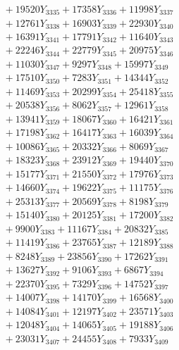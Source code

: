 \documentclass[a4paper,10pt]{article}
\begin{document}
{\begin{align}
&\;  + 19520 Y_{3335} + 17358 Y_{3336} + 11998 Y_{3337} \\[0.3ex]
&\;  + 12761 Y_{3338} + 16903 Y_{3339} + 22930 Y_{3340} \\[0.3ex]
&\;  + 16391 Y_{3341} + 17791 Y_{3342} + 11640 Y_{3343} \\[0.3ex]
&\;  + 22246 Y_{3344} + 22779 Y_{3345} + 20975 Y_{3346} \\[0.3ex]
&\;  + 11030 Y_{3347} + 9297 Y_{3348} + 15997 Y_{3349} \\[0.3ex]
&\;  + 17510 Y_{3350} + 7283 Y_{3351} + 14344 Y_{3352} \\[0.3ex]
&\;  + 11469 Y_{3353} + 20299 Y_{3354} + 25418 Y_{3355} \\[0.3ex]
&\;  + 20538 Y_{3356} + 8062 Y_{3357} + 12961 Y_{3358} \\[0.5ex]\allowbreak
&\;  + 13941 Y_{3359} + 18067 Y_{3360} + 16421 Y_{3361} \\[0.3ex]
&\;  + 17198 Y_{3362} + 16417 Y_{3363} + 16039 Y_{3364} \\[0.3ex]
&\;  + 10086 Y_{3365} + 20332 Y_{3366} + 8069 Y_{3367} \\[0.3ex]
&\;  + 18323 Y_{3368} + 23912 Y_{3369} + 19440 Y_{3370} \\[0.3ex]
&\;  + 15177 Y_{3371} + 21550 Y_{3372} + 17976 Y_{3373} \\[0.3ex]
&\;  + 14660 Y_{3374} + 19622 Y_{3375} + 11175 Y_{3376} \\[0.3ex]
&\;  + 25313 Y_{3377} + 20569 Y_{3378} + 8198 Y_{3379} \\[0.3ex]
&\;  + 15140 Y_{3380} + 20125 Y_{3381} + 17200 Y_{3382} \\[0.3ex]
&\;  + 9900 Y_{3383} + 11167 Y_{3384} + 20832 Y_{3385} \\[0.3ex]
&\;  + 11419 Y_{3386} + 23765 Y_{3387} + 12189 Y_{3388} \\[0.5ex]\allowbreak
&\;  + 8248 Y_{3389} + 23856 Y_{3390} + 17262 Y_{3391} \\[0.3ex]
&\;  + 13627 Y_{3392} + 9106 Y_{3393} + 6867 Y_{3394} \\[0.3ex]
&\;  + 22370 Y_{3395} + 7329 Y_{3396} + 14752 Y_{3397} \\[0.3ex]
&\;  + 14007 Y_{3398} + 14170 Y_{3399} + 16568 Y_{3400} \\[0.3ex]
&\;  + 14084 Y_{3401} + 12197 Y_{3402} + 23571 Y_{3403} \\[0.3ex]
&\;  + 12048 Y_{3404} + 14065 Y_{3405} + 19188 Y_{3406} \\[0.3ex]
&\;  + 23031 Y_{3407} + 24455 Y_{3408} + 7933 Y_{3409} \\[0.3ex]

\end{align}}
\end{document}
